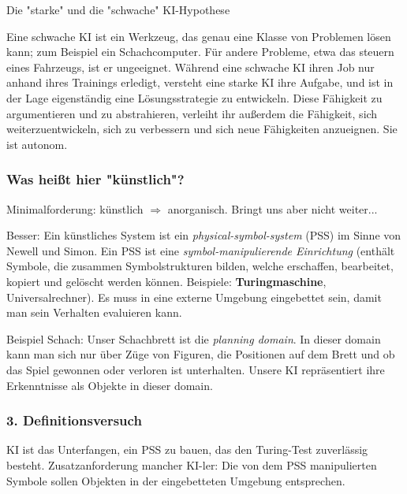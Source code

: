 \documentclass[runningheads]{llncs}
\begin{document}
\begin{definition}{Die "starke" und die "schwache" KI-Hypothese}

Eine schwache KI ist ein Werkzeug, das genau eine Klasse von Problemen lösen kann; zum Beispiel ein Schachcomputer. Für andere Probleme, etwa das steuern eines Fahrzeugs, ist er ungeeignet. Während eine schwache KI ihren Job nur anhand ihres Trainings erledigt, versteht eine starke KI ihre Aufgabe, und ist in der Lage eigenständig eine Lösungsstrategie zu entwickeln. Diese Fähigkeit zu argumentieren und zu abstrahieren, verleiht ihr außerdem die Fähigkeit, sich weiterzuentwickeln, sich zu verbessern und sich neue Fähigkeiten anzueignen. Sie ist autonom.

\end{definition}

\subsubsection{Was heißt hier "künstlich"?}

Minimalforderung: künstlich $\Rightarrow$ anorganisch. Bringt uns aber nicht weiter...

Besser: Ein künstliches System ist ein \textit{physical-symbol-system} (PSS) im Sinne von Newell und Simon. Ein PSS ist eine \textit{symbol-manipulierende Einrichtung} (enthält Symbole, die zusammen Symbolstrukturen bilden, welche erschaffen, bearbeitet, kopiert und gelöscht werden können. Beispiele: \textbf{Turingmaschine}, Universalrechner). Es muss in eine externe Umgebung eingebettet sein, damit man sein Verhalten evaluieren kann.

Beispiel Schach: Unser Schachbrett ist die \textit{planning domain}. In dieser domain kann man sich nur über Züge von Figuren, die Positionen auf dem Brett und ob das Spiel gewonnen oder verloren ist unterhalten. Unsere KI repräsentiert ihre Erkenntnisse als Objekte in dieser domain.


\subsubsection{3. Definitionsversuch}

KI ist das Unterfangen, ein PSS zu bauen, das den Turing-Test zuverlässig besteht.
Zusatzanforderung mancher KI-ler: Die von dem PSS manipulierten Symbole sollen Objekten in der eingebetteten Umgebung entsprechen.
\end{document}
